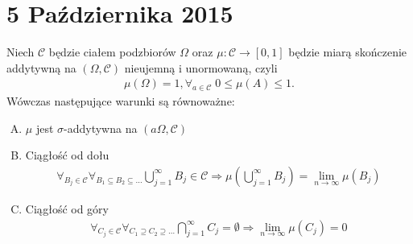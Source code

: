 \chapter{5 Października 2015}
\begin{twr}
Niech $ \mathcal C $ będzie ciałem podzbiorów $ \Omega $ oraz $ \mu:\mathcal C\to\left[0,1\right] $ będzie miarą skończenie addytywną na $ \left(\Omega,\mathcal C\right) $ nieujemną i unormowaną, czyli 
\begin{gather*}
\mu(\Omega)=1,\forall_{a\in\mathcal C}\; 0\le\mu(A)\le 1.
\end{gather*} Wówczas następujące warunki są równoważne:
\begin{enumerate}[(A)]
\item $ \mu $ jest $\sigma$-addytywna na $ \left(a\Omega,\mathcal C\right) $
\item Ciągłość od dołu
\begin{gather*}
\forall_{B_j\in\mathcal C}\forall_{B_1\subseteq B_2\subseteq \dots} \bigcup_{j=1}^\infty B_j\in\mathcal C 
\Rightarrow
\mu \left(\bigcup_{j=1}^\infty B_j\right)=\lim\limits_{n\to\infty} \mu \left(B_j\right)
\end{gather*}
\item Ciągłość od góry
\begin{gather*}
\forall_{C_j\in\mathcal C}\forall_{C_1\supseteq C_2\supseteq \dots}
\bigcap_{j=1}^\infty C_j=\emptyset
\Rightarrow
\lim\limits_{n\to\infty} \mu \left(C_j\right)=0
\end{gather*}
\end{enumerate}
\end{twr}
